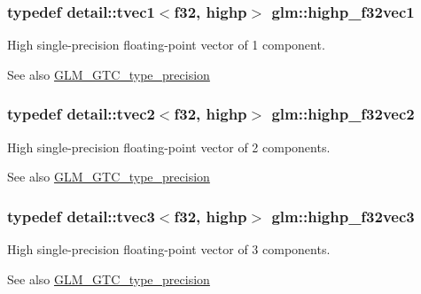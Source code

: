 \subsubsection[{\texorpdfstring{highp\+\_\+f32vec1}{highp_f32vec1}}]{\setlength{\rightskip}{0pt plus 5cm}typedef detail\+::tvec1$<$f32, highp$>$ {\bf glm\+::highp\+\_\+f32vec1}}\hypertarget{group__gtc__type__precision_gac8be8ce31b9df0a5005d7c7458a3d03e}{}\label{group__gtc__type__precision_gac8be8ce31b9df0a5005d7c7458a3d03e}
High single-\/precision floating-\/point vector of 1 component. \begin{DoxySeeAlso}{See also}
\hyperlink{group__gtc__type__precision}{G\+L\+M\+\_\+\+G\+T\+C\+\_\+type\+\_\+precision} 
\end{DoxySeeAlso}
\subsubsection[{\texorpdfstring{highp\+\_\+f32vec2}{highp_f32vec2}}]{\setlength{\rightskip}{0pt plus 5cm}typedef detail\+::tvec2$<$f32, highp$>$ {\bf glm\+::highp\+\_\+f32vec2}}\hypertarget{group__gtc__type__precision_gabba3e1b3ae0bcaa7aaac573c08c2f8d3}{}\label{group__gtc__type__precision_gabba3e1b3ae0bcaa7aaac573c08c2f8d3}
High single-\/precision floating-\/point vector of 2 components. \begin{DoxySeeAlso}{See also}
\hyperlink{group__gtc__type__precision}{G\+L\+M\+\_\+\+G\+T\+C\+\_\+type\+\_\+precision} 
\end{DoxySeeAlso}
\subsubsection[{\texorpdfstring{highp\+\_\+f32vec3}{highp_f32vec3}}]{\setlength{\rightskip}{0pt plus 5cm}typedef detail\+::tvec3$<$f32, highp$>$ {\bf glm\+::highp\+\_\+f32vec3}}\hypertarget{group__gtc__type__precision_ga581a4a4eb1f3a269d16af0c4e2d8daf4}{}\label{group__gtc__type__precision_ga581a4a4eb1f3a269d16af0c4e2d8daf4}
High single-\/precision floating-\/point vector of 3 components. \begin{DoxySeeAlso}{See also}
\hyperlink{group__gtc__type__precision}{G\+L\+M\+\_\+\+G\+T\+C\+\_\+type\+\_\+precision} 
\end{DoxySeeAlso}
